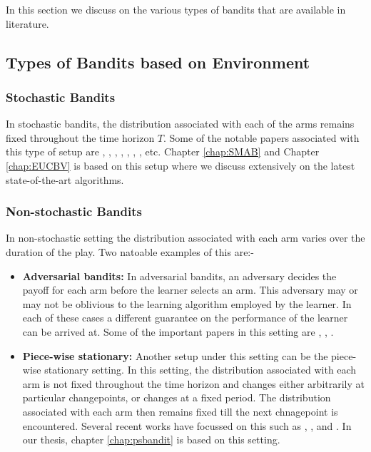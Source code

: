 In this section we discuss on the various types of bandits that are available in literature. 


\subsection{Types of Bandits based on Environment}


\subsubsection{Stochastic Bandits}
In stochastic bandits, the distribution associated with each of the arms remains fixed throughout the time horizon $T$. Some of the notable papers associated with this type of setup are \citet{robbins1952some}, \citet{lai1985asymptotically},  \citet{agrawal1995sample}, \citet{auer2002finite}, \citet{auer2010ucb}, \citet{audibert2009minimax}, \citet{lattimore2015optimally}, etc. Chapter \ref{chap:SMAB} and Chapter \ref{chap:EUCBV} is based on this setup where we discuss extensively on the latest state-of-the-art algorithms.



\subsubsection{Non-stochastic Bandits}

In non-stochastic setting the distribution associated with each arm varies over the duration of the play. Two natoable examples of this are:-

\begin{itemize}
\item \textbf{Adversarial bandits: } In adversarial bandits, an adversary decides the payoff for each arm before the learner selects an arm. This adversary may or may not be oblivious to the learning algorithm employed by the learner. In each of these cases a different guarantee on the performance of the learner can be arrived at. Some of the important papers in this setting are \citet{auer2002nonstochastic}, \citet{auer2002using}, \citet{kocak2014efficient}.

\item \textbf{Piece-wise stationary:} Another setup under this setting can be the piece-wise stationary setting. In this setting, the distribution associated with each arm is not fixed throughout the time horizon and changes either arbitrarily at particular changepoints, or changes at a fixed period. The distribution associated with each arm then  remains fixed till the next chnagepoint is encountered. Several recent works have focussed on this such as  \citep{garivier2011upper}, \citep{mellor2013thompson}, and \citep{allesiardo2017non}. In our thesis, chapter \ref{chap:psbandit} is based on this setting. 
\end{itemize}


